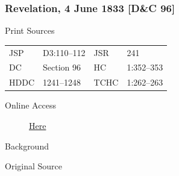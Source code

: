 		\subsubsection{Revelation, 4 June 1833 [D\&C 96]}
			\label{EMS-1833-JS-4-JUN-1833}
		
			\begin{description}
				\item[Print Sources]
			\end{description}

				\begin{tabular}{p{0.5in}p{1in}p{0.5in}p{1in}}
				JSP	 	& D3:110--112		& JSR 		& 241 \\
				DC	 	& Section 96 		& HC 		& 1:352--353 \\
				HDDC 	& 1241--1248		& TCHC 		& 1:262--263 \\
				\end{tabular}
			
			\begin{description}
				\item[Online Access] \href{https://www.josephsmithpapers.org/paper-summary/revelation-4-june-1833-dc-96/1}{Here}
			\end{description}
			
			\begin{description}
				\item[Background]
			\end{description}
			
			
			\begin{description}
				\item[Original Source]
			\end{description}
			
			
